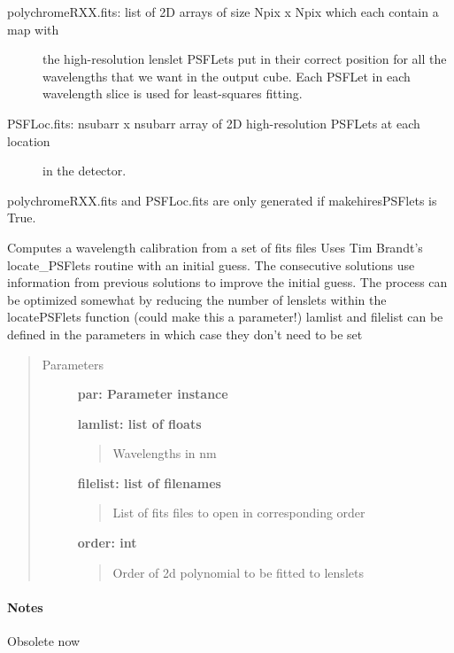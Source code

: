 \documentclass[letterpaper,10pt,english]{sphinxmanual}
\begin{document}
\begin{fulllineitems}
\begin{description}
\item[{polychromeRXX.fits: list of 2D arrays of size Npix x Npix which each contain a map with}] \leavevmode
the high-resolution lenslet PSFLets put in their correct position
for all the wavelengths that we want in the output cube. Each PSFLet
in each wavelength slice is used for least-squares fitting.

\item[{PSFLoc.fits:    nsubarr x nsubarr array of 2D high-resolution PSFLets at each location}] \leavevmode
in the detector.

\end{description}

polychromeRXX.fits and PSFLoc.fits are only generated if makehiresPSFlets is True.

\end{fulllineitems}


\begin{fulllineitems}
\label{tools:tools.wavecal.computeWavecal}
Computes a wavelength calibration from a set of fits files
Uses Tim Brandt's locate\_PSFlets routine with an initial guess.
The consecutive solutions use information from previous solutions to improve the
initial guess.
The process can be optimized somewhat by reducing the number of lenslets within
the locatePSFlets function (could make this a parameter!)
lamlist and filelist can be defined in the parameters in which case they don't need to be set
\begin{quote}\begin{description}
\item[{Parameters}] \leavevmode
\textbf{par:        Parameter instance}

\textbf{lamlist:    list of floats}
\begin{quote}

Wavelengths in nm
\end{quote}

\textbf{filelist:   list of filenames}
\begin{quote}

List of fits files to open in corresponding order
\end{quote}

\textbf{order:      int}
\begin{quote}

Order of 2d polynomial to be fitted to lenslets
\end{quote}

\end{description}\end{quote}
\paragraph{Notes}

Obsolete now

\end{fulllineitems}
\end{document}
